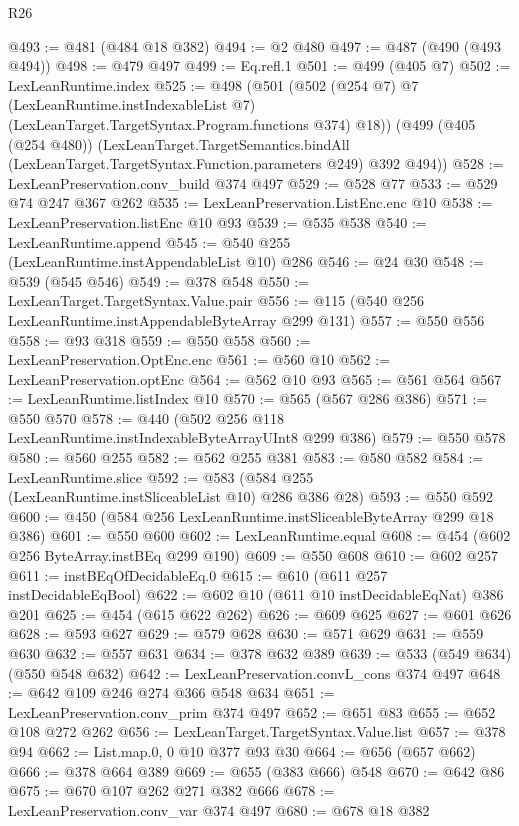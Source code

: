 \begin{lexlean}{R26}
\begin{coremodule}
@493 := @481 (@484 @18 @382)
@494 := @2 @480
@497 := @487 (@490 (@493 @494))
@498 := @479 @497
@499 := Eq.refl.{1}
@501 := @499 (@405 @7)
@502 := LexLeanRuntime.index
@525 := @498
    (@501
      (@502
        (@254 @7)
        @7
        (LexLeanRuntime.instIndexableList @7)
        (LexLeanTarget.TargetSyntax.Program.functions @374)
        @18))
    (@499
      (@405 (@254 @480))
      (LexLeanTarget.TargetSemantics.bindAll
        (LexLeanTarget.TargetSyntax.Function.parameters @249)
        @392
        @494))
@528 := LexLeanPreservation.conv_build @374 @497
@529 := @528 @77
@533 := @529 @74 @247 @367 @262
@535 := LexLeanPreservation.ListEnc.enc @10
@538 := LexLeanPreservation.listEnc @10 @93
@539 := @535 @538
@540 := LexLeanRuntime.append
@545 := @540 @255 (LexLeanRuntime.instAppendableList @10) @286
@546 := @24 @30
@548 := @539 (@545 @546)
@549 := @378 @548
@550 := LexLeanTarget.TargetSyntax.Value.pair
@556 := @115 (@540 @256 LexLeanRuntime.instAppendableByteArray @299 @131)
@557 := @550 @556
@558 := @93 @318
@559 := @550 @558
@560 := LexLeanPreservation.OptEnc.enc
@561 := @560 @10
@562 := LexLeanPreservation.optEnc
@564 := @562 @10 @93
@565 := @561 @564
@567 := LexLeanRuntime.listIndex @10
@570 := @565 (@567 @286 @386)
@571 := @550 @570
@578 := @440 (@502 @256 @118 LexLeanRuntime.instIndexableByteArrayUInt8 @299 @386)
@579 := @550 @578
@580 := @560 @255
@582 := @562 @255 @381
@583 := @580 @582
@584 := LexLeanRuntime.slice
@592 := @583 (@584 @255 (LexLeanRuntime.instSliceableList @10) @286 @386 @28)
@593 := @550 @592
@600 := @450 (@584 @256 LexLeanRuntime.instSliceableByteArray @299 @18 @386)
@601 := @550 @600
@602 := LexLeanRuntime.equal
@608 := @454 (@602 @256 ByteArray.instBEq @299 @190)
@609 := @550 @608
@610 := @602 @257
@611 := instBEqOfDecidableEq.{0}
@615 := @610 (@611 @257 instDecidableEqBool)
@622 := @602 @10 (@611 @10 instDecidableEqNat) @386 @201
@625 := @454 (@615 @622 @262)
@626 := @609 @625
@627 := @601 @626
@628 := @593 @627
@629 := @579 @628
@630 := @571 @629
@631 := @559 @630
@632 := @557 @631
@634 := @378 @632 @389
@639 := @533 (@549 @634) (@550 @548 @632)
@642 := LexLeanPreservation.convL_cons @374 @497
@648 := @642 @109 @246 @274 @366 @548 @634
@651 := LexLeanPreservation.conv_prim @374 @497
@652 := @651 @83
@655 := @652 @108 @272 @262
@656 := LexLeanTarget.TargetSyntax.Value.list
@657 := @378 @94
@662 := List.map.{0, 0} @10 @377 @93 @30
@664 := @656 (@657 @662)
@666 := @378 @664 @389
@669 := @655 (@383 @666) @548
@670 := @642 @86
@675 := @670 @107 @262 @271 @382 @666
@678 := LexLeanPreservation.conv_var @374 @497
@680 := @678 @18 @382

\end{coremodule}
\end{lexlean}
